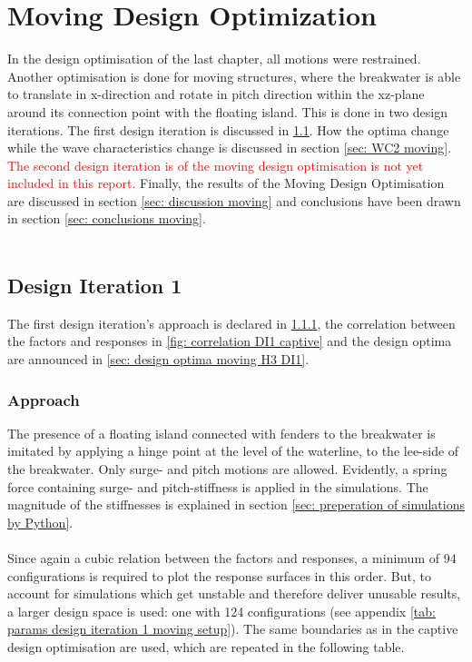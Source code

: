 \chapter{Moving Design Optimization}
\label{ch: moving design optimisation}
In the design optimisation of the last chapter, all motions were restrained. Another optimisation is done for moving structures, where the breakwater is able to translate in x-direction and rotate in pitch direction within the xz-plane around its connection point with the floating island. This is done in two design iterations. The first design iteration is discussed in \ref{sec: design iteration 1 moving}. How the optima change while the wave characteristics change is discussed in section \ref{sec: WC2 moving}. \textcolor{red}{The second design iteration is of the moving design optimisation is not yet included in this report.} Finally, the results of the Moving Design Optimisation are discussed in section \ref{sec: discussion moving} and conclusions have been drawn in section \ref{sec: conclusions moving}.\\
\\


\section{Design Iteration 1}
\label{sec: design iteration 1 moving}

The first design iteration's approach is declared in \ref{sec: approach moving H3 DI1}, the correlation between the factors and responses in \ref{fig: correlation DI1 captive} and the design optima are announced in \ref{sec: design optima moving H3 DI1}. 


\subsection{Approach}
\label{sec: approach moving H3 DI1}
The presence of a floating island connected with fenders to the breakwater is imitated by applying a hinge point at the level of the waterline, to the lee-side of the breakwater. Only surge- and pitch motions are allowed. Evidently, a spring force containing surge- and pitch-stiffness is applied in the simulations. The magnitude of the stiffnesses is explained in section \ref{sec: preperation of simulations by Python}.\\
\\
Since again a cubic relation between the factors and responses, a minimum of 94 configurations is required to plot the response surfaces in this order. But, to account for simulations which get unstable and therefore deliver unusable results, a larger design space is used: one with 124 configurations (see appendix \ref{tab: params design iteration 1 moving setup}). The same boundaries as in the captive design optimisation are used, which are repeated in the following table.


